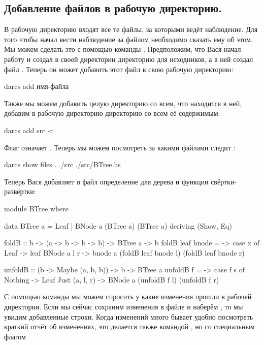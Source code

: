 \subsection{Добавление файлов в рабочую директорию.}

В рабочую директорию входят все те файлы, за которыми
 ведёт наблюдение. Для того чтобы 
начал вести наблюдение за файлом необходимо сказать 
ему об этом. Мы можем сделать это с помощью команды .
Предположим, что Вася начал работу и создал в своей
директории директорию  для исходников, а в ней
создал файл . Теперь он может добавить 
этот файл в свою рабочую директорию:

\begin{code}
darcs add имя-файла
\end{code}

Также мы можем добавить целую директорию со всем, что 
находится в ней, добавим в рабочую директорию директорию  со
всем её содержимым:

\begin{code}
darcs add src -r
\end{code}

Флаг  означает . Теперь мы можем
посмотреть за какими файлами следит :

\begin{code}
darcs show files
.
./src
./src/BTree.hs
\end{code}

Теперь Вася добавляет в файл  определение для 
дерева и функции свёртки-развёртки:

\begin{code}
module BTree where

data BTree a = Leaf | BNode a (BTree a) (BTree a)
    deriving (Show, Eq)

foldB :: b -> (a -> b -> b -> b) -> BTree a -> b
foldB leaf bnode = \x -> case x of
    Leaf        -> leaf
    BNode a l r -> bnode a (foldB leaf bnode l) (foldB leaf bnode r)

unfoldB :: (b -> Maybe (a, b, b)) -> b -> BTree a
unfoldB f = \s -> case f s of
    Nothing         -> Leaf
    Just (a, l, r)  -> BNode a (unfoldB f l) (unfoldB f r)
\end{code}

С помощью команды  мы можем спросить у 
какие изменения прошли в рабочей директории. Если мы сейчас
сохраним изменения в файле и наберём , то
мы увидим добавленные строки. Когда изменений много бывает
удобно посмотреть краткий отчёт об изменениях, это делается
также командой , но со специальным флагом 

